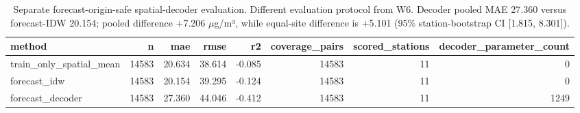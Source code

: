 \begin{table}[t]
\centering
\scriptsize
\caption{Separate forecast-origin-safe spatial-decoder evaluation. Different evaluation protocol from W6. Decoder pooled MAE 27.360 versus forecast-IDW 20.154; pooled difference +7.206 $\mu$g/m³, while equal-site difference is +5.101 (95\% station-bootstrap CI [1.815, 8.301]).}
\label{tab:t04b_decoder_protocol}
\begin{tabular}{lrrrrrrr}
\hline
method & n & mae & rmse & r2 & coverage\_pairs & scored\_stations & decoder\_parameter\_count \\
\hline
train\_only\_spatial\_mean & 14583 & 20.634 & 38.614 & -0.085 & 14583 & 11 & 0 \\
forecast\_idw & 14583 & 20.154 & 39.295 & -0.124 & 14583 & 11 & 0 \\
forecast\_decoder & 14583 & 27.360 & 44.046 & -0.412 & 14583 & 11 & 1249 \\
\hline
\end{tabular}
\end{table}
